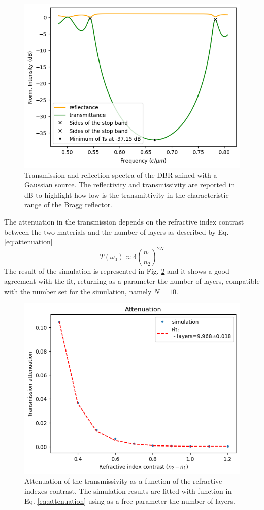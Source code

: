 \begin{figure}[H]
    \centering
    \includegraphics[width=0.6\linewidth]{Figures/bragg_spectrum.png}
    \caption{Transmission and reflection spectra of the DBR shined with a Gaussian source. The reflectivity and transmissivity are reported in dB to highlight how low is the transmittivity in the characteristic range of the Bragg reflector.}
    \label{fig:bragg_spectrum}
\end{figure}

The attenuation in the transmission depends on the refractive index contrast between the two materials and the number of layers as described by Eq. \ref{eq:attenuation}
\begin{equation} \label{eq:attenuation}
    T(\omega_0) \approx 4 \left(\frac{n_1}{n_2}\right)^{2N} 
\end{equation}
The result of the simulation is represented in Fig. \ref{fig:bragg_attenuation_vs_index} and it shows a good agreement with the fit, returning as a parameter the number of layers, compatible with the number set for the simulation, namely \(N=10\).

\begin{figure}[H]
    \centering
    \includegraphics[width=0.6\linewidth]{Figures/bragg_attenuation_vs_index.png}
    \caption{Attenuation of the transmissivity as a function of the refractive indexes contrast. The simulation results are fitted with function in Eq. \ref{eq:attenuation} using as a free parameter the number of layers.}
    \label{fig:bragg_attenuation_vs_index}
\end{figure}

